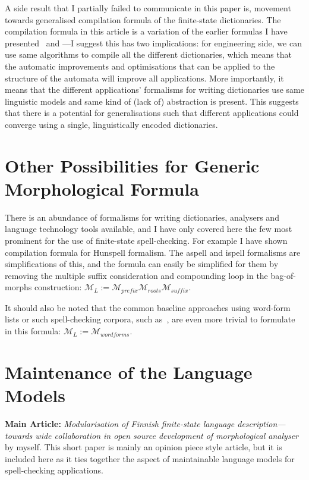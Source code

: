 \documentclass[officiallayout]{unihelcompling}
\begin{document}
A side result that I partially failed to communicate in this paper is, movement
towards generalised compilation formula of the finite-state dictionaries. The
compilation formula in this article is a variation of the earlier formulas I
have presented~\citep{linden2009hfst} and ---I
suggest this has two implications: for engineering side, we can use same
algorithms to compile all the different dictionaries, which means that the
automatic improvements and optimisations that can be applied to the structure
of the automata will improve all applications. More importantly, it means that
the different applications' formalisms for writing dictionaries use same
linguistic models and same kind of (lack of) abstraction is present. This
suggests that there is a potential for generalisations such that different
applications could converge using a single, linguistically encoded
dictionaries.

\section{Other Possibilities for Generic Morphological Formula}
\label{sec:other-lms}

There is an abundance of formalisms for writing dictionaries, analysers and
language technology tools available, and I have only covered here the few most
prominent for the use of finite-state spell-checking. For example I have shown
compilation formula for Hunspell formalism. The aspell and ispell formalisms
are simplifications of this, and the formula can easily be simplified for them
by removing the multiple suffix consideration and compounding loop in the
bag-of-morphs construction: $\mathcal{M}_L := \mathcal{M}_{prefix}
\mathcal{M}_{roots} \mathcal{M}_{suffix}$.

It should also be noted that the common baseline approaches using word-form
lists or such spell-checking corpora, such as~\citet{norvig2010howto}, are even
more trivial to formulate in this formula: $\mathcal{M}_L :=
\mathcal{M}_{wordforms}$.

\section{Maintenance of the Language Models}
\label{sec:maintenance}

\textbf{Main Article:} \emph{Modularisation of Finnish finite-state language 
description—towards wide collaboration in open source development of
morphological analyser} by myself. This short paper is mainly an opinion
piece style article, but it is included here as it ties together the
aspect of maintainable language models for spell-checking applications.
\end{document}
